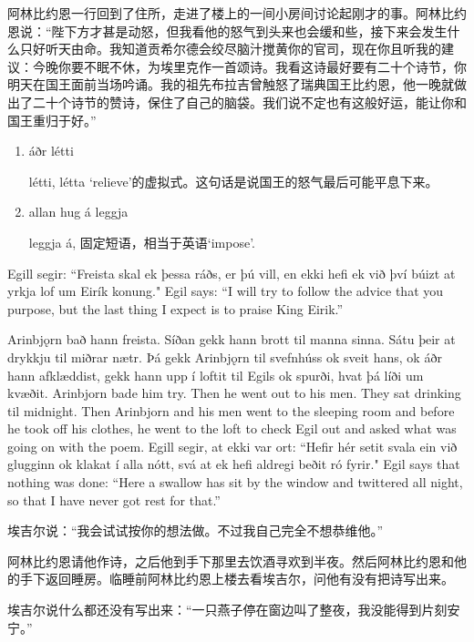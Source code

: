 \begin{translation*}{}
    阿林比约恩一行回到了住所，走进了楼上的一间小房间讨论起刚才的事。阿林比约恩说：“陛下方才甚是动怒，但我看他的怒气到头来也会缓和些，接下来会发生什么只好听天由命。我知道贡希尔德会绞尽脑汁搅黄你的官司，现在你且听我的建议：今晚你要不眠不休，为埃里克作一首颂诗。我看这诗最好要有二十个诗节，你明天在国王面前当场吟诵。我的祖先布拉吉曾触怒了瑞典国王比约恩，他一晚就做出了二十个诗节的赞诗，保住了自己的脑袋。我们说不定也有这般好运，能让你和国王重归于好。”
\end{translation*}
\begin{grammar*}{}
    \begin{enumerate}[leftmargin=*]
        \item áðr létti

              létti, létta `relieve'的虚拟式。这句话是说国王的怒气最后可能平息下来。
        \item allan hug á leggja

              leggja á, 固定短语，相当于英语`impose'.
    \end{enumerate}
\end{grammar*}
\begin{paracol}{2}
    Egill segir: ``Freista skal ek þessa ráðs, er þú vill, en ekki hefi ek við því búizt at yrkja lof um Eirík konung."
    \switchcolumn
    Egil says: ``I will try to follow the advice that you purpose, but the last thing I expect is to praise King Eirik.''

    \switchcolumn*
    Arinbjǫrn bað hann freista. Síðan gekk hann brott til manna sinna. Sátu þeir at drykkju til miðrar nætr. Þá gekk Arinbjǫrn til svefnhúss ok sveit hans, ok áðr hann afklæddist, gekk hann upp í loftit til Egils ok spurði, hvat þá líði um kvæðit.
    \switchcolumn
    Arinbjorn bade him try. Then he went out to his men. They sat drinking til midnight. Then Arinbjorn and his men went to the sleeping room and before he took off his clothes, he went to the loft to check Egil out and asked what was going on with the poem.
    \switchcolumn*
    Egill segir, at ekki var ort: ``Hefir hér setit svala ein við glugginn ok klakat í alla nótt, svá at ek hefi aldregi beðit ró fyrir."
    \switchcolumn
    Egil says that nothing was done: ``Here a swallow has sit by the window and twittered all night, so that I have never got rest for that.''

\end{paracol}
\begin{translation*}{}
    埃吉尔说：“我会试试按你的想法做。不过我自己完全不想恭维他。”

    阿林比约恩请他作诗，之后他到手下那里去饮酒寻欢到半夜。然后阿林比约恩和他的手下返回睡房。临睡前阿林比约恩上楼去看埃吉尔，问他有没有把诗写出来。

    埃吉尔说什么都还没有写出来：“一只燕子停在窗边叫了整夜，我没能得到片刻安宁。”

\end{translation*}
